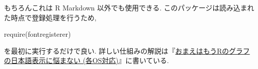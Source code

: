 \documentclass[
]{bxjsbook}
\newenvironment{Shaded}{\begin{snugshade}}{\end{snugshade}}
\newcommand{\FunctionTok}[1]{\textcolor[rgb]{0.00,0.00,0.00}{#1}}
\newcommand{\NormalTok}[1]{#1}
\theoremstyle{definition}
\theoremstyle{definition}
\theoremstyle{definition}
\theoremstyle{remark}
\begin{document}
もちろんこれは R Markdown 以外でも使用できる.
このパッケージは読み込まれた時点で登録処理を行うため,

\begin{Shaded}
\begin{Highlighting}[numbers=left,,]
\FunctionTok{require}\NormalTok{(fontregisterer)}
\end{Highlighting}
\end{Shaded}

を最初に実行するだけで良い.
詳しい仕組みの解説は『\href{https://ill-identified.hatenablog.com/entry/2020/10/03/200618}{おまえはもうRのグラフの日本語表示に悩まない
(各OS対応)}』に書いている.



\printbibliography[title=参考文献,heading=bibintoc]
\end{document}
